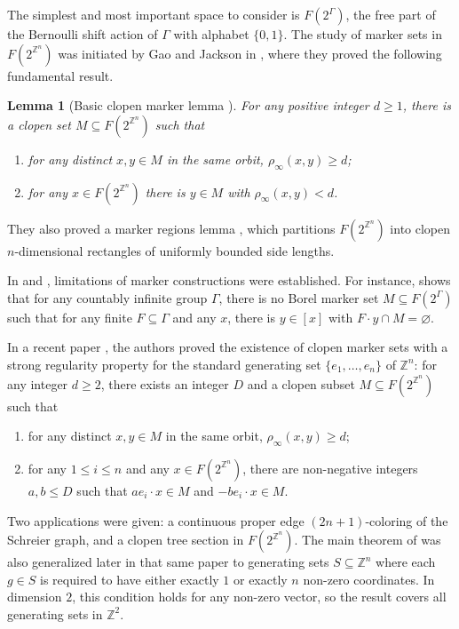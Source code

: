 \documentclass[10pt,a4paper]{amsart}
\newtheorem{lemma}[theorem]{Lemma}
\newcommand{\Z}{\mathbb Z}
\begin{document}
The simplest and most important space to consider is $F(2^\Gamma)$, the free
part of the Bernoulli shift action of $\Gamma$ with alphabet $\{0,1\}$.
The study of marker sets in $F(2^{\mathbb{Z}^n})$ was initiated by Gao and
Jackson in \cite{GJ15}, where they proved the following fundamental result.

\begin{lemma}[Basic clopen marker lemma {\cite[Lemma 2.1]{GJ15}}]
\label{lem:basicmarker-intro}
For any positive integer $d\geq 1$, there is a clopen set
$M\subseteq F(2^{\mathbb{Z}^n})$ such that
\begin{enumerate}
\item[(1)] for any distinct $x, y\in M$ in the same orbit,
$\rho_\infty(x,y)\geq d$;
\item[(2)] for any $x\in F(2^{\mathbb{Z}^n})$ there is $y\in M$
with $\rho_\infty(x,y)<d$.
\end{enumerate}
\end{lemma}

They also proved a marker regions lemma \cite[Theorem 3.1]{GJ15}, which
partitions $F(2^{\mathbb{Z}^n})$ into clopen $n$-dimensional rectangles
of uniformly bounded side lengths.

In \cite{GJKS22} and \cite{GJKS23}, limitations of marker constructions
were established. For instance, \cite[Theorem 1.2]{GJKS22} shows that for
any countably infinite group $\Gamma$, there is no Borel marker set
$M\subseteq F(2^\Gamma)$ such that for any finite $F\subseteq \Gamma$
and any $x$, there is $y\in [x]$ with $F\cdot y\cap M=\varnothing$.

In a recent paper \cite{GW25}, the authors proved the existence of clopen
marker sets with a strong regularity property for the standard generating
set $\{e_1,\dots,e_n\}$ of $\mathbb{Z}^n$: for any integer $d\geq 2$, there exists an integer $D$ and a clopen subset $M\subseteq F(2^{\Z^n})$ such that 
\begin{enumerate}
\item[(1)] for any distinct $x,y\in M$ in the same orbit,
$\rho_\infty(x,y)\geq d$;
\item[(2)] for any $1\leq i\leq n$ and any $x\in F(2^{\mathbb{Z}^n})$,
there are non-negative integers $a,b\leq D$ such that
$ae_i\cdot x\in M$ and $-be_i\cdot x\in M$.
\end{enumerate}
Two applications were given: a continuous proper edge $(2n+1)$-coloring of
the Schreier graph, and a clopen tree section in $F(2^{\mathbb{Z}^n})$.
The main theorem of \cite{GW25} was also generalized later in that same
paper to generating sets $S\subseteq \mathbb{Z}^n$ where each $g\in S$ is
required to have either exactly $1$ or exactly $n$ non-zero coordinates.
In dimension $2$, this condition holds for any non-zero vector, so the
result covers all generating sets in $\mathbb{Z}^2$.
\end{document}

